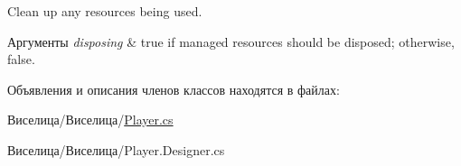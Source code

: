 Clean up any resources being used. 


\begin{DoxyParams}{Аргументы}
{\em disposing} & true if managed resources should be disposed; otherwise, false.\\
\hline
\end{DoxyParams}


Объявления и описания членов классов находятся в файлах\+:\begin{DoxyCompactItemize}
\item 
Виселица/Виселица/\hyperlink{_player_8cs}{Player.\+cs}\item 
Виселица/Виселица/Player.\+Designer.\+cs\end{DoxyCompactItemize}
